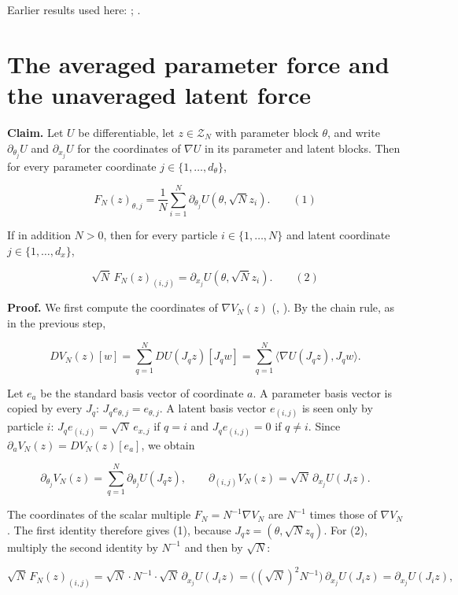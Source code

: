 \documentclass[11pt,a4paper]{article}
\begin{document}
Earlier results used here: \cite[Section~3.1.1]{LangevinLean2026IPLA}; \cite[Section~3.1.3]{LangevinLean2026IPLA}.

\section{\texorpdfstring{The averaged parameter force and the unaveraged latent force}{The averaged parameter force and the unaveraged latent force}}


\textbf{Claim.} Let \(U\) be differentiable, let \(z\in\mathcal Z_N\) with parameter block \(\theta\), and write \(\partial_{\theta_j}U\) and \(\partial_{x_j}U\) for the coordinates of \(\nabla U\) in its parameter and latent blocks. Then for every parameter coordinate \(j\in\{1,\dots,d_\theta\}\),


\[F_N(z)_{\theta,j}=\frac1N\sum_{i=1}^N\partial_{\theta_j}U(\theta,\sqrt Nz_i).\qquad(1)\]


If in addition \(N>0\), then for every particle \(i\in\{1,\dots,N\}\) and latent coordinate \(j\in\{1,\dots,d_x\}\),


\[\sqrt N\,F_N(z)_{(i,j)}=\partial_{x_j}U(\theta,\sqrt Nz_i).\qquad(2)\]


\textbf{Proof.} We first compute the coordinates of \(\nabla V_N(z)\) (\cite[Section~3.1.5]{LangevinLean2026IPLA}, \cite[Section~3.1.5]{LangevinLean2026IPLA}). By the chain rule, as in the previous step,


\[DV_N(z)[w]=\sum_{q=1}^NDU(J_qz)[J_qw]=\sum_{q=1}^N\langle\nabla U(J_qz),J_qw\rangle.\]


Let \(e_a\) be the standard basis vector of coordinate \(a\). A parameter basis vector is copied by every \(J_q\): \(J_qe_{\theta,j}=e_{\theta,j}\). A latent basis vector \(e_{(i,j)}\) is seen only by particle \(i\): \(J_qe_{(i,j)}=\sqrt N\,e_{x,j}\) if \(q=i\) and \(J_qe_{(i,j)}=0\) if \(q\ne i\). Since \(\partial_aV_N(z)=DV_N(z)[e_a]\), we obtain


\[\partial_{\theta_j}V_N(z)=\sum_{q=1}^N\partial_{\theta_j}U(J_qz),\qquad\partial_{(i,j)}V_N(z)=\sqrt N\,\partial_{x_j}U(J_iz).\]


The coordinates of the scalar multiple \(F_N=N^{-1}\nabla V_N\) are \(N^{-1}\) times those of \(\nabla V_N\). The first identity therefore gives (1), because \(J_qz=(\theta,\sqrt Nz_q)\). For (2), multiply the second identity by \(N^{-1}\) and then by \(\sqrt N\):


\[\sqrt N\,F_N(z)_{(i,j)}=\sqrt N\cdot N^{-1}\cdot\sqrt N\,\partial_{x_j}U(J_iz)=\bigl((\sqrt N)^2N^{-1}\bigr)\,\partial_{x_j}U(J_iz)=\partial_{x_j}U(J_iz),\]
\end{document}

